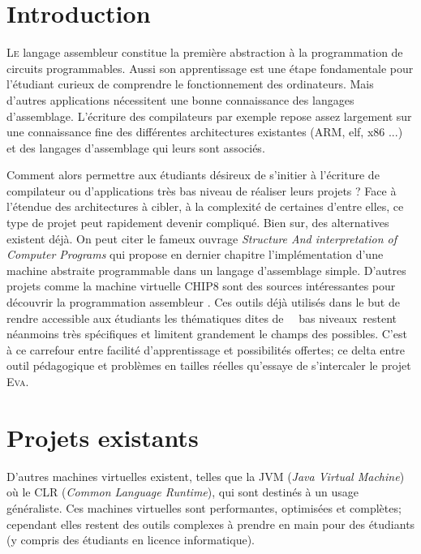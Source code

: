 \documentclass[11pt,twoside]{article}
\makeatletter
\providecommand{\og}{\leavevmode\flqq~}%
\providecommand{\fg}{\ifdim\lastskip>\z@\unskip\fi~\frqq}%
\newcommand{\noun}[1]{\textsc{#1}}
\makeatother
\begin{document}
\hspace{0pt}
\vfill

\section{Introduction}

\lettrine[lines=3,slope=.3em]%
{L}{e} langage assembleur constitue la première abstraction à la programmation
de circuits programmables. Aussi son apprentissage est une étape fondamentale pour l'étudiant curieux de comprendre le fonctionnement des ordinateurs. Mais d'autres applications nécessitent une bonne connaissance des langages d'assemblage. L'écriture des compilateurs par exemple repose assez largement sur une connaissance fine des différentes architectures existantes (ARM, elf, x86 ...) et des langages d'assemblage qui leurs sont associés.

Comment alors permettre aux étudiants désireux de s'initier à l'écriture de compilateur ou d'applications très bas niveau de réaliser leurs projets ? Face à l'étendue des architectures à cibler, à la complexité de certaines d’entre elles, ce type de projet peut rapidement devenir compliqué. Bien sur, des alternatives existent déjà. On peut citer le fameux ouvrage \textit{Structure And interpretation of Computer Programs} \cite{SICP} qui propose en dernier chapitre l'implémentation d'une machine abstraite programmable dans un langage d'assemblage simple. D'autres projets comme la machine virtuelle CHIP8 sont des sources intéressantes pour découvrir la programmation assembleur \cite{CHIP8}. Ces outils déjà utilisés dans le but de rendre accessible aux étudiants les thématiques dites de \og~bas niveaux\fg restent néanmoins très spécifiques et limitent grandement le champs des possibles. C'est à ce carrefour entre facilité d'apprentissage et possibilités offertes; ce delta entre outil pédagogique et problèmes en tailles réelles qu'essaye de s'intercaler le projet \noun{Eva}. \\

\section{Projets existants}

D'autres machines virtuelles existent, telles que la JVM (\emph{Java Virtual Machine}) où le CLR (\emph{Common Language Runtime}), qui sont destinés à un usage généraliste. Ces machines virtuelles sont performantes, optimisées et complètes; cependant elles restent des outils complexes à prendre en main pour des étudiants (y compris des étudiants en licence informatique).\\
\end{document}
